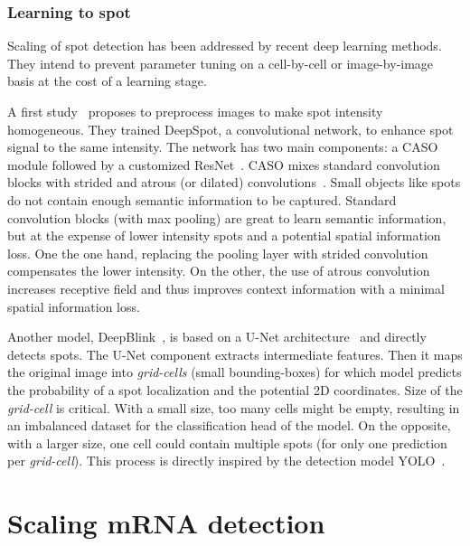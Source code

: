
\subsubsection{Learning to spot}

Scaling of spot detection has been addressed by recent deep learning methods.
They intend to prevent parameter tuning on a cell-by-cell or image-by-image basis at the cost of a learning stage.

A first study~\cite{bouilhol_deepspot_2022} proposes to preprocess images to make spot intensity homogeneous.
They trained DeepSpot, a convolutional network, to enhance spot signal to the same intensity.
The network has two main components: a \ac{CASO} module followed by a customized ResNet~\cite{He_2016}.
\ac{CASO} mixes standard convolution blocks with strided and atrous (or dilated) convolutions~\cite{Hamaguchi_2018}.
Small objects like spots do not contain enough semantic information to be captured.
Standard convolution blocks (with max pooling) are great to learn semantic information, but at the expense of lower intensity spots and a potential spatial information loss.
One the one hand, replacing the pooling layer with strided convolution compensates the lower intensity.
On the other, the use of atrous convolution increases receptive field and thus improves context information with a minimal spatial information loss.

Another model, DeepBlink~\cite{eichenberger_deepblink_2021}, is based on a U-Net architecture~\cite{Ronneberger_2015} and directly detects spots.
The U-Net component extracts intermediate features.
Then it maps the original image into \emph{grid-cells} (small bounding-boxes) for which model predicts the probability of a spot localization and the potential 2D coordinates.
Size of the \emph{grid-cell} is critical.
With a small size, too many cells might be empty, resulting in an imbalanced dataset for the classification head of the model.
On the opposite, with a larger size, one cell could contain multiple spots (for only one prediction per \emph{grid-cell}).
This process is directly inspired by the detection model YOLO~\cite{Redmon_2016_CVPR}.

\section{Scaling \ac{mRNA} detection}
\label{sec:method}

